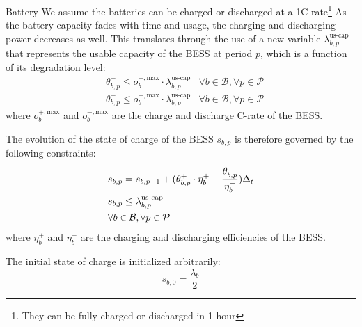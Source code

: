 \begin{frame}[allowframebreaks]{Battery}
We assume the batteries can be charged or discharged at a 1C-rate\footnote{They can be fully charged or discharged in 1 hour} 
As the battery capacity fades with time and usage, the charging and discharging power decreases as well. This translates through the use of a new variable $\lambda_{b,p}^\text{us-cap}$ that represents the usable capacity of the BESS at period $p$, which is a function of its degradation level:
\begin{align}
     &\theta_{b,p}^+ \leq  o_b^{+, \text{max}} \cdot \lambda^\text{us-cap}_{b,p} &\forall  b \in \mathcal{B}, \forall  p \in \mathcal{P} \\
     &\theta_{b,p}^- \leq o_b^{-, \text{max}} \cdot \lambda^\text{us-cap}_{b,p} &\forall  b \in \mathcal{B}, \forall  p \in \mathcal{P} 
\end{align}
where $o_b^{+, \text{max}}$ and $o_b^{-, \text{max}}$ are the charge and discharge C-rate of the BESS.


The evolution of the state of charge of the BESS $s_{b,p}$ is therefore governed by the following constraints:
\begin{align}
     &s_{b,p} = s_{b, p-1} + (\theta_{b,p}^+ \cdot \eta_b^+ - \frac{\theta_{b,p}^-}{\eta_b^-}) \Delta_t  \\
     &s_{b,p} \leq \lambda^\text{us-cap}_{b,p}  \\
     &\forall  b \in \mathcal{B}, \forall  p \in \mathcal{P} \notag
\end{align}
where $\eta_b^+$ and $\eta_b^-$ are the charging and discharging efficiencies of the BESS.

The initial state of charge is initialized arbitrarily:
$$s_{b,0} = \frac{\lambda_b}{2}$$


\end{frame}
